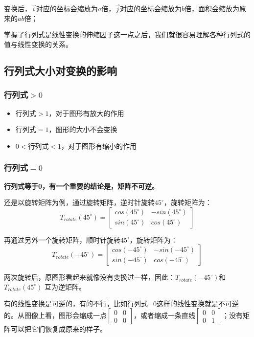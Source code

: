 \documentclass[12pt]{article}
\begin{document}
变换后，$\vec{i}$对应的坐标会缩放为$a$倍，$\vec{j}$对应的坐标会缩放为$b$倍，面积会缩放为原来的$ab$倍；

掌握了行列式是线性变换的伸缩因子这一点之后，我们就很容易理解各种行列式的值与线性变换的关系。

\subsection{行列式大小对变换的影响}
\subsubsection{行列式$>0$}
\begin{itemize}
    \item 行列式$>1$，对于图形有放大的作用
    \item 行列式$=1$，图形的大小不会变换
    \item $0<$行列式$<1$，对于图形有缩小的作用
\end{itemize}

\subsubsection{行列式$=0$}
\textbf{行列式等于0，有一个重要的结论是，矩阵不可逆。}

还是以旋转矩阵为例，通过旋转矩阵，逆时针旋转$45^\circ$，旋转矩阵为：
$$
T_{rotate}(45^\circ)=\begin{bmatrix}cos(45^\circ)&-sin(45^\circ)\\sin(45^\circ)&cos(45^\circ)\end{bmatrix}
$$

再通过另外一个旋转矩阵，顺时针旋转$45^\circ$，旋转矩阵为：
$$
T_{rotate}(-45^\circ)=\begin{bmatrix}cos(-45^\circ)&-sin(-45^\circ)\\sin(-45^\circ)&cos(-45^\circ)\end{bmatrix}
$$

两次旋转后，原图形看起来就像没有变换过一样，因此：$T_{rotate}(-45^\circ)$和$T_{rotate}(45^\circ) $ 互为逆矩阵。

有的线性变换是可逆的，有的不行，比如行列式=0这样的线性变换就是不可逆的。从图像上看，图形会缩成一点$\begin{bmatrix}0&0\\0&0\end{bmatrix}$，或者缩成一条直线$\begin{bmatrix}0&0\\0&1\end{bmatrix}$；没有矩阵可以把它们恢复成原来的样子。
\end{document}
